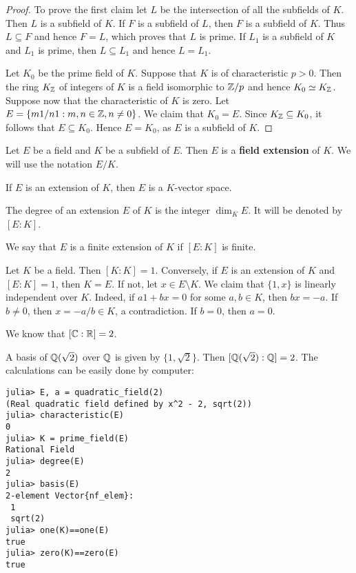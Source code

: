 \begin{proof}
	To prove the first claim let $L$ be the intersection
	of all the subfields of $K$. Then $L$ is a subfield of $K$. 
	If $F$ is a subfield of $L$, then $F$ is a subfield
	of $K$. Thus $L\subseteq F$ and hence $F=L$, which proves
	that $L$ is prime. If $L_1$ is a subfield of $K$
	and $L_1$ is prime, then $L\subseteq L_1$ and 
	hence $L=L_1$. 

	Let $K_0$ be the prime field of $K$. Suppose that $K$ is of characteristic
	$p>0$. Then the ring $K_{\mathbb{Z}}$ of integers of $K$ 
	is a field isomorphic to $\mathbb{Z}/p$ and hence $K_0\simeq
	K_{\mathbb{Z}}$. Suppose now that the characteristic of $K$ is zero. Let
	$E=\{m1/n1:m,n\in\mathbb{Z},n\ne 0\}$. We claim that $K_0=E$. Since $K_{\mathbb{Z}}\subseteq
	K_0$, it follows that $E\subseteq K_0$. Hence $E=K_0$, as $E$ is a subfield
	of $K$.  
\end{proof}

\begin{definition}
	Let $E$ be a field and $K$ be a subfield of $E$. Then 
	$E$ is a \textbf{field extension} of $K$. We will use
	the notation $E/K$. 
\end{definition}

If $E$ is an extension of $K$, then $E$ is a
$K$-vector space. 

\begin{definition}
	The degree of an extension $E$ of $K$ 
	is the integer $\dim_KE$. It will be denoted by $[E:K]$. 
\end{definition}

We say that $E$ is a finite extension of $K$ 
if $[E:K]$ is finite. 

\begin{example}
	Let $K$ be a field. Then $[K:K]=1$. Conversely, 
	if $E$ is an extension of $K$ and $[E:K]=1$, then $K=E$. 
	If not, let $x\in E\setminus K$. We claim that
	$\{1,x\}$ is linearly independent over $K$. Indeed, 
	if $a1+bx=0$ for some $a,b\in K$, then $bx=-a$. If 
	$b\ne 0$, then $x=-a/b\in K$, a contradiction. If $b=0$, then 
	$a=0$. 
\end{example}

We know that $[\mathbb{C}:\mathbb{R}]=2$. 

\begin{example}
	A basis of $\mathbb{Q}(\sqrt{2})$ over $\mathbb{Q}$ 
	is given by $\{1,\sqrt{2}\}$. Then 
	$[\mathbb{Q}(\sqrt{2}):\mathbb{Q}]=2$. The calculations 
	can be easily done by computer: 
\begin{lstlisting}
julia> E, a = quadratic_field(2)
(Real quadratic field defined by x^2 - 2, sqrt(2))
julia> characteristic(E)
0
julia> K = prime_field(E)
Rational Field
julia> degree(E)
2
julia> basis(E)
2-element Vector{nf_elem}:
 1
 sqrt(2)
julia> one(K)==one(E)
true
julia> zero(K)==zero(E)
true
\end{lstlisting}
\end{example}

